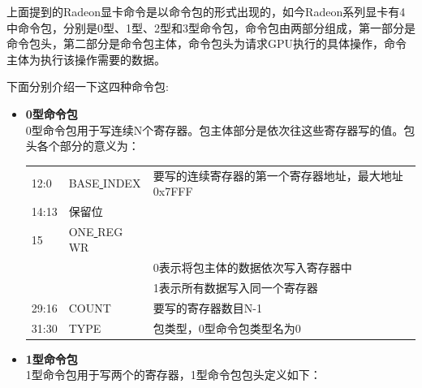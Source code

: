 上面提到的Radeon显卡命令是以命令包的形式出现的，如今Radeon系列显卡有4中命令包，分别是0型、1型、2型和3型命令包，命令包由两部分组成，第一部分是命令包头，第二部分是命令包主体，命令包头为请求GPU执行的具体操作，命令主体为执行该操作需要的数据。

下面分别介绍一下这四种命令包:

\begin{itemize}

\item{\textbf{0型命令包}} \\
0型命令包用于写连续N个寄存器。包主体部分是依次往这些寄存器写的值。包头各个部分的意义为：
\vspace{6pt}
\begin{center}  
\tablelasttail{\bottomrule}

\begin{supertabular}{p{2.cm}p{3.cm}m{10.cm}}
	12:0 & BASE\underline{ }INDEX & 要写的连续寄存器的第一个寄存器地址，最大地址0x7FFF \\
	14:13 & 保留位 & \\
	15 & ONE\underline{ }REG\underline{ }WR &  \\ 
	& & \tabitem 0表示将包主体的数据依次写入寄存器中 \\
	& & \tabitem 1表示所有数据写入同一个寄存器 \\
	29:16 & COUNT & 要写的寄存器数目N-1 \\
	31:30 & TYPE & 包类型，0型命令包类型名为0 \\
\end{supertabular}
\end{center}
\vspace{6pt}


\item{\textbf{1型命令包}} \\
1型命令包用于写两个的寄存器，1型命令包包头定义如下：
\vspace{6pt}
\begin{center}  
\tablelasttail{\bottomrule}


\end{center}
\end{itemize}
